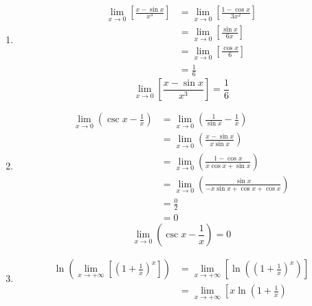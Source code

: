 \begin{Solution}
  \label{solution first derivative higher}
\end{Solution}








\begin{Solution}
  \label{solution lim (x - sin x)/x3}
  \renewcommand{\theenumi}{\alph{enumi}}
  \begin{enumerate}
  \item
    \begin{align*}
      \lim_{x \to 0} \left[ \frac{x-\sin x}{x^3} \right]
      &= \lim_{x \to 0} \left[ \frac{1-\cos x}{3 x^2} \right] \\
      &= \lim_{x \to 0} \left[ \frac{\sin x}{6 x} \right] \\
      &= \lim_{x \to 0} \left[ \frac{\cos x}{6} \right] \\
      &= \frac{1}{6}
    \end{align*}
    \[
    \boxed{
      \lim_{x \to 0} \left[ \frac{x-\sin x}{x^3} \right] = \frac{1}{6}
      }
    \]
  \item
    \begin{align*}
      \lim_{x \to 0} \left( \csc x - \frac{1}{x} \right)
      &= \lim_{x \to 0} \left( \frac{1}{\sin x} - \frac{1}{x} \right) \\
      &= \lim_{x \to 0} \left( \frac{x - \sin x}{x \sin x} \right) \\
      &= \lim_{x \to 0} \left( \frac{1 - \cos x}{x \cos x + \sin x} \right)\\
      &= \lim_{x \to 0} \left( \frac{\sin x}{- x \sin x + \cos x + \cos x}
      \right) \\
      &= \frac{0}{2} \\
      &= 0
    \end{align*}
    \[
    \boxed{
      \lim_{x \to 0} \left( \csc x - \frac{1}{x} \right) = 0
      }
    \]
  \item
    \begin{align*}
      \ln\left( \lim_{x \to +\infty} \left[ \left(1 + \frac{1}{x} \right)^x
        \right] \right)
      &= \lim_{x \to +\infty} \left[ \ln\left( \left(1 + \frac{1}{x}
          \right)^x \right) \right] \\
      &= \lim_{x \to +\infty} \left[ x \ln\left(1+\frac{1}{x}\right)

\end{align*}
\end{enumerate}
\end{Solution}
